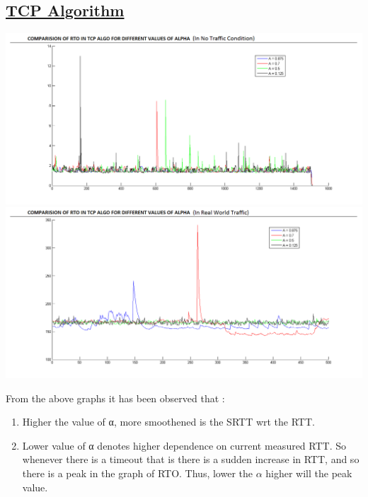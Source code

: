 \documentclass[12pt]{article}
\begin{document}
\subsection{\underline{TCP Algorithm}}
\begin{center}
 \includegraphics[scale=0.5]{tcp.png}
\includegraphics[scale=0.5]{tcp1.png}
\end{center}
From the above graphs it has been observed that :
\begin{enumerate}
\item Higher the value of α, more smoothened is the SRTT wrt the RTT.
\item Lower value of α denotes higher dependence on current measured RTT. So whenever there is a timeout that is there is a sudden increase in RTT, and so there is a peak in the graph of RTO. Thus, lower the $\alpha$ higher will the peak value.
\end{enumerate} 
\end{document}
